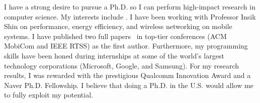 I have a strong desire to pursue a Ph.D. so I can perform high-impact research in computer science. My interests include \researchinterests. I have been working with Professor Insik Shin on performance, energy efficiency, and wireless networking on mobile systems. I have published two full papers~\cite{ebrowser, greenbag} in top-tier conferences (ACM MobiCom and IEEE RTSS) as the first author. Furthermore, my programming skills have been honed during internships at some of the world's largest technology corporations (Microsoft, Google, and Samsung). For my research results, I was rewarded with the prestigious Qualcomm Innovation Award and a Naver Ph.D. Fellowship.
I believe that doing a Ph.D. in the U.S. would allow me to fully exploit my potential.
